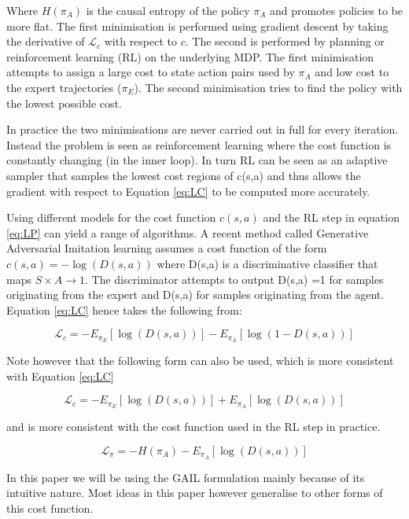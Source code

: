 \documentclass[letterpaper, 10 pt, conference]{ieeeconf}
\begin{document}
Where $H(\pi_A)$ is the causal entropy of the policy $\pi_A$ and promotes policies to be more flat. 
The first minimisation is performed using gradient descent by taking the derivative of $\mathcal{L}_c$ with respect to $c$. The second is performed by planning or reinforcement learning (RL) on the underlying MDP. The first minimisation attempts to assign a large cost to state action pairs used by $\pi_A$ and low cost to the expert trajectories ($\pi_E$). The second minimisation tries to find the policy with the lowest possible cost. 

In practice the two minimisations are never carried out in full for every iteration. Instead the problem is seen as reinforcement learning where the cost function is constantly changing (in the inner loop). In turn RL can be seen as an adaptive sampler that samples the lowest cost regions of c(s,a) and thus allows the gradient with respect to Equation \ref{eq:LC}  to be computed more accurately.

Using different models for the cost function $c(s,a)$ and the RL step in equation \ref{eq:LP} can yield a range of algorithms. A recent method called Generative Adversarial Imitation learning assumes a cost function of the form $c(s,a) = -\log(D(s,a))$ where D(s,a) is a discriminative classifier that maps $S \times A \rightarrow 1$. The discriminator attempts to output D(s,a) =1 for samples originating from the expert and D(s,a) for samples originating from the agent. Equation \ref{eq:LC} hence takes the following from:

\begin{equation}
  \mathcal{L}_c = -E_{\pi_E}[\log(D(s,a))] - E_{\pi_A}[\log(1- D(s,a))] \label{eq:LCgail}
\end{equation}

Note however that the following form can also be used, which is more consistent with Equation \ref{eq:LC}

\begin{equation}
  \mathcal{L}_c = -E_{\pi_E}[\log(D(s,a))] + E_{\pi_A}[\log(D(s,a))] \label{eq:LCgail2}
\end{equation}

and is more consistent with the cost function used in the RL step in practice.

\begin{equation}
  \mathcal{L}_{\pi} = -H(\pi_A) - E_{\pi_A}[\log(D(s,a))] \label{eq:LPgail}
\end{equation}

In this paper we will be using the GAIL formulation mainly because of its intuitive nature. Most ideas in this paper however generalise to other forms of this cost function. 
\end{document}
